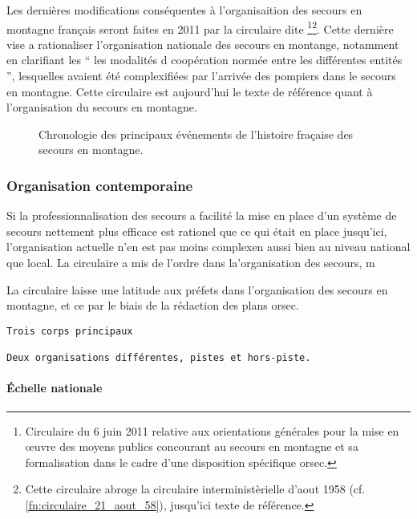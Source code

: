 Les dernières modifications conséquentes à l'organisaition des secours
en montagne français seront faites en 2011 par la circulaire dite
 \footnote{Circulaire du 6 juin 2011 relative aux
  orientations générales pour la mise en œuvre des moyens publics
  concourant au secours en montagne et sa formalisation dans le cadre
  d’une disposition spécifique
  \ac{orsec}.}\multiplefootnoteseparator\footnote{Cette circulaire
  abroge la circulaire interministèrielle d'aout 1958
  (cf. \autoref{fn:circulaire_21_aout_58}), jusqu'ici texte de
  référence.}. Cette dernière vise a rationaliser l'organisation
nationale des secours en montange, notamment en clarifiant les
\enquote{\textelp{} les modalités d coopération normée
  entre les différentes entités \textelp{}}, lesquelles avaient été
complexifiées par l'arrivée des pompiers dans le secours en
montagne. Cette circulaire est aujourd'hui le texte de référence quant
à l'organisation du secours en montagne.

\begin{figure}
  \centering
   
   \caption{Chronologie des principaux événements de
     l'histoire fraçaise des secours en montagne.}
  \label{fig:frise_chronologique}
\end{figure}

\subsubsection{Organisation contemporaine}
\label{subsubsec:1-1-1-2}

Si la professionnalisation des secours a facilité la mise en place
d'un système de secours nettement plus efficace est rationel que ce
qui était en place jusqu'ici, l'organisation actuelle n'en est pas
moins complexen aussi bien au niveau national que local. La circulaire
 a mis de l'ordre dans la'organisation des secours, m

La circulaire  laisse une latitude aux préfets dans
l'organisation des secours en montagne, et ce par le biais de la
rédaction des plans \ac{orsec}.

\begin{verbatim}
Trois corps principaux

Deux organisations différentes, pistes et hors-piste.
\end{verbatim}


\paragraph{Échelle nationale}


